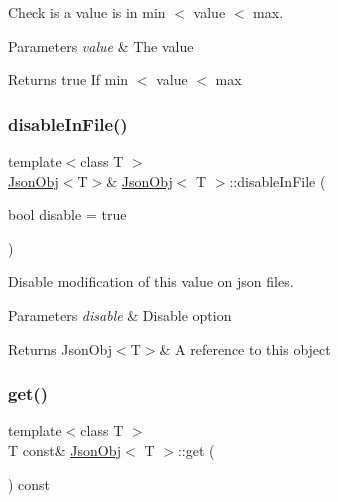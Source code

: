 Check is a value is in min $<$ value $<$ max. 


\begin{DoxyParams}{Parameters}
{\em value} & The value \\
\hline
\end{DoxyParams}
\begin{DoxyReturn}{Returns}
true If min $<$ value $<$ max 
\end{DoxyReturn}
\mbox{\label{class_json_obj_a52dcca1a1778122b6e7cb11c5a93b530}} 
\subsubsection{\texorpdfstring{disable\+In\+File()}{disableInFile()}}
{\footnotesize\ttfamily template$<$class T $>$ \\
\hyperlink{class_json_obj}{Json\+Obj}$<$T$>$\& \hyperlink{class_json_obj}{Json\+Obj}$<$ T $>$\+::disable\+In\+File (\begin{DoxyParamCaption}\item[{bool}]{disable = {\ttfamily true} }\end{DoxyParamCaption})\hspace{0.3cm}{\ttfamily [inline]}}



Disable modification of this value on json files. 


\begin{DoxyParams}{Parameters}
{\em disable} & Disable option \\
\hline
\end{DoxyParams}
\begin{DoxyReturn}{Returns}
Json\+Obj$<$\+T$>$\& A reference to \textquotesingle{}this\textquotesingle{} object 
\end{DoxyReturn}
\mbox{\label{class_json_obj_af4da480aa1a66ca266c3f91b6f5b9a29}} 
\subsubsection{\texorpdfstring{get()}{get()}\hspace{0.1cm}{\footnotesize\ttfamily [1/2]}}
{\footnotesize\ttfamily template$<$class T $>$ \\
T const\& \hyperlink{class_json_obj}{Json\+Obj}$<$ T $>$\+::get (\begin{DoxyParamCaption}{ }\end{DoxyParamCaption}) const\hspace{0.3cm}{\ttfamily [inline]}}



